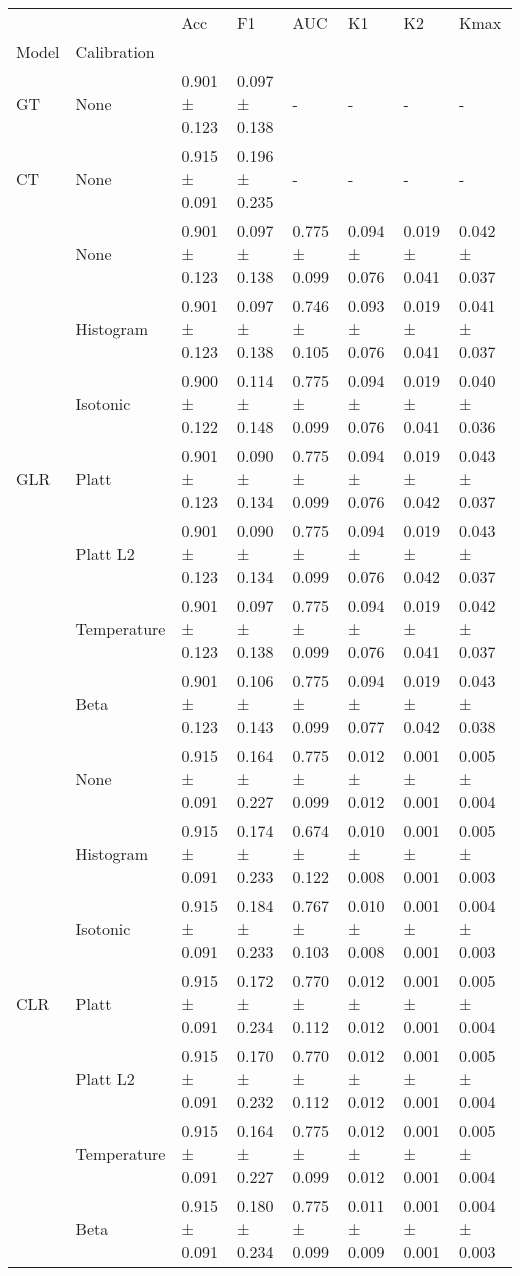 \begin{tabular}{llllllll}
\toprule
 &  & Acc & F1 & AUC & K1 & K2 & Kmax \\
Model & Calibration &  &  &  &  &  &  \\
\midrule
GT & None & 0.901 ± 0.123 & 0.097 ± 0.138 & - & - & - & - \\
\cline{1-8}
CT & None & 0.915 ± 0.091 & 0.196 ± 0.235 & - & - & - & - \\
\cline{1-8}
\multirow[t]{7}{*}{GLR} & None & 0.901 ± 0.123 & 0.097 ± 0.138 & 0.775 ± 0.099 & 0.094 ± 0.076 & 0.019 ± 0.041 & 0.042 ± 0.037 \\
 & Histogram & 0.901 ± 0.123 & 0.097 ± 0.138 & 0.746 ± 0.105 & 0.093 ± 0.076 & 0.019 ± 0.041 & 0.041 ± 0.037 \\
 & Isotonic & 0.900 ± 0.122 & 0.114 ± 0.148 & 0.775 ± 0.099 & 0.094 ± 0.076 & 0.019 ± 0.041 & 0.040 ± 0.036 \\
 & Platt & 0.901 ± 0.123 & 0.090 ± 0.134 & 0.775 ± 0.099 & 0.094 ± 0.076 & 0.019 ± 0.042 & 0.043 ± 0.037 \\
 & Platt L2 & 0.901 ± 0.123 & 0.090 ± 0.134 & 0.775 ± 0.099 & 0.094 ± 0.076 & 0.019 ± 0.042 & 0.043 ± 0.037 \\
 & Temperature & 0.901 ± 0.123 & 0.097 ± 0.138 & 0.775 ± 0.099 & 0.094 ± 0.076 & 0.019 ± 0.041 & 0.042 ± 0.037 \\
 & Beta & 0.901 ± 0.123 & 0.106 ± 0.143 & 0.775 ± 0.099 & 0.094 ± 0.077 & 0.019 ± 0.042 & 0.043 ± 0.038 \\
\cline{1-8}
\multirow[t]{7}{*}{CLR} & None & 0.915 ± 0.091 & 0.164 ± 0.227 & 0.775 ± 0.099 & 0.012 ± 0.012 & 0.001 ± 0.001 & 0.005 ± 0.004 \\
 & Histogram & 0.915 ± 0.091 & 0.174 ± 0.233 & 0.674 ± 0.122 & 0.010 ± 0.008 & 0.001 ± 0.001 & 0.005 ± 0.003 \\
 & Isotonic & 0.915 ± 0.091 & 0.184 ± 0.233 & 0.767 ± 0.103 & 0.010 ± 0.008 & 0.001 ± 0.001 & 0.004 ± 0.003 \\
 & Platt & 0.915 ± 0.091 & 0.172 ± 0.234 & 0.770 ± 0.112 & 0.012 ± 0.012 & 0.001 ± 0.001 & 0.005 ± 0.004 \\
 & Platt L2 & 0.915 ± 0.091 & 0.170 ± 0.232 & 0.770 ± 0.112 & 0.012 ± 0.012 & 0.001 ± 0.001 & 0.005 ± 0.004 \\
 & Temperature & 0.915 ± 0.091 & 0.164 ± 0.227 & 0.775 ± 0.099 & 0.012 ± 0.012 & 0.001 ± 0.001 & 0.005 ± 0.004 \\
 & Beta & 0.915 ± 0.091 & 0.180 ± 0.234 & 0.775 ± 0.099 & 0.011 ± 0.009 & 0.001 ± 0.001 & 0.004 ± 0.003 \\

\end{tabular}
